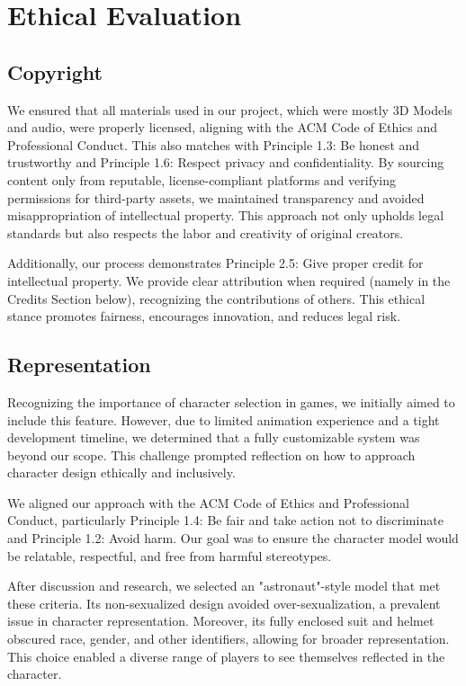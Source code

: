\documentclass[11pt]{article}
\begin{document}

\section{Ethical Evaluation}
\subsection{Copyright}
We ensured that all materials used in our project, which were mostly 3D Models and audio, were properly licensed, aligning with the ACM Code of Ethics and Professional Conduct. This also matches with Principle 1.3: Be honest and trustworthy and Principle 1.6: Respect privacy and confidentiality. By sourcing content only from reputable, license-compliant platforms and verifying permissions for third-party assets, we maintained transparency and avoided misappropriation of intellectual property. This approach not only upholds legal standards but also respects the labor and creativity of original creators.

Additionally, our process demonstrates Principle 2.5: Give proper credit for intellectual property. We provide clear attribution when required (namely in the Credits Section below), recognizing the contributions of others. This ethical stance promotes fairness, encourages innovation, and reduces legal risk.

\subsection{Representation}
Recognizing the importance of character selection in games, we initially aimed to include this feature. However, due to limited animation experience and a tight development timeline, we determined that a fully customizable system was beyond our scope. This challenge prompted reflection on how to approach character design ethically and inclusively.

We aligned our approach with the ACM Code of Ethics and Professional Conduct, particularly Principle 1.4: Be fair and take action not to discriminate and Principle 1.2: Avoid harm. Our goal was to ensure the character model would be relatable, respectful, and free from harmful stereotypes.

After discussion and research, we selected an "astronaut"-style model that met these criteria. Its non-sexualized design avoided over-sexualization, a prevalent issue in character representation. Moreover, its fully enclosed suit and helmet obscured race, gender, and other identifiers, allowing for broader representation. This choice enabled a diverse range of players to see themselves reflected in the character.
\end{document}
